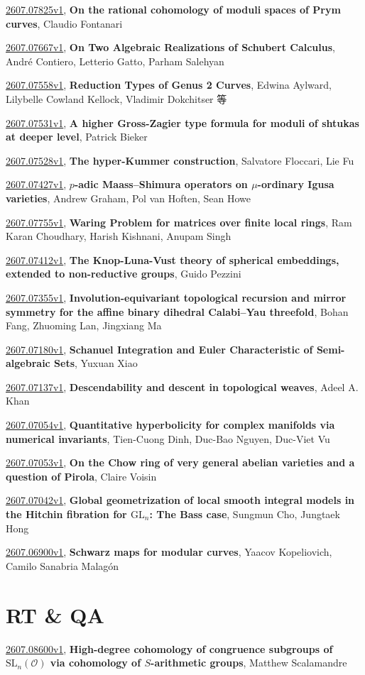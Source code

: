 \documentclass[9pt, a4paper]{article}
\theoremstyle{plain}
\theoremstyle{definition}
\theoremstyle{remark}
\newcommand{\arxiv}[3]{\href{https://arxiv.org/abs/#1}{#1}, \textbf{\textcolor{arxivblue}{#2}}, #3}
\begin{document}
\arxiv{2607.07825v1}{On the rational cohomology of moduli spaces of Prym curves}{Claudio Fontanari}

\arxiv{2607.07667v1}{On Two Algebraic Realizations of Schubert Calculus}{André Contiero, Letterio Gatto, Parham Salehyan}

\arxiv{2607.07558v1}{Reduction Types of Genus 2 Curves}{Edwina Aylward, Lilybelle Cowland Kellock, Vladimir Dokchitser 等}

\arxiv{2607.07531v1}{A higher Gross-Zagier type formula for moduli of shtukas at deeper level}{Patrick Bieker}

\arxiv{2607.07528v1}{The hyper-Kummer construction}{Salvatore Floccari, Lie Fu}

\arxiv{2607.07427v1}{$p$-adic Maass--Shimura operators on $μ$-ordinary Igusa varieties}{Andrew Graham, Pol van Hoften, Sean Howe}

\arxiv{2607.07755v1}{Waring Problem for matrices over finite local rings}{Ram Karan Choudhary, Harish Kishnani, Anupam Singh}

\arxiv{2607.07412v1}{The Knop-Luna-Vust theory of spherical embeddings, extended to non-reductive groups}{Guido Pezzini}

\arxiv{2607.07355v1}{Involution-equivariant topological recursion and mirror symmetry for the affine binary dihedral Calabi--Yau threefold}{Bohan Fang, Zhuoming Lan, Jingxiang Ma}

\arxiv{2607.07180v1}{Schanuel Integration and Euler Characteristic of Semi-algebraic Sets}{Yuxuan Xiao}

\arxiv{2607.07137v1}{Descendability and descent in topological weaves}{Adeel A. Khan}

\arxiv{2607.07054v1}{Quantitative hyperbolicity for complex manifolds via numerical invariants}{Tien-Cuong Dinh, Duc-Bao Nguyen, Duc-Viet Vu}

\arxiv{2607.07053v1}{On the Chow ring of very general abelian varieties and a question of Pirola}{Claire Voisin}

\arxiv{2607.07042v1}{Global geometrization of local smooth integral models in the Hitchin fibration for $\mathrm{GL}_n$: The Bass case}{Sungmun Cho, Jungtaek Hong}

\arxiv{2607.06900v1}{Schwarz maps for modular curves}{Yaacov Kopeliovich, Camilo Sanabria Malagón}


\section{RT \& QA}
\arxiv{2607.08600v1}{High-degree cohomology of congruence subgroups of $\text{SL}_n(\mathcal{O})$ via cohomology of $S$-arithmetic groups}{Matthew Scalamandre}
\end{document}
